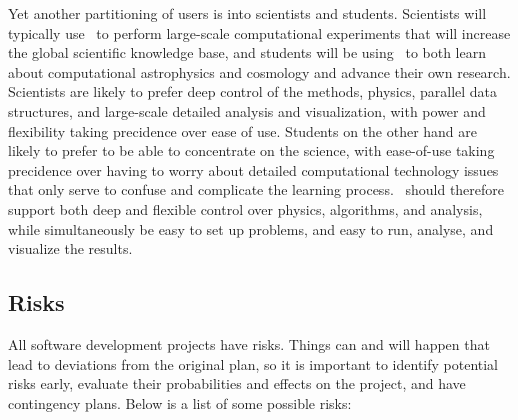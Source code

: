 \documentclass[11pt]{article}
\begin{document}
    Yet another partitioning of users is into scientists and students.
    Scientists will typically use \cello\ to perform large-scale
    computational experiments that will increase the global scientific
    knowledge base, and students will be using \cello\ to both learn
    about computational astrophysics and cosmology and advance their
    own research.  Scientists are likely to prefer deep control of the
    methods, physics, parallel data structures, and large-scale
    detailed analysis and visualization, with power and flexibility
    taking precidence over ease of use.  Students on the other hand
    are likely to prefer to be able to concentrate on the science,
    with ease-of-use taking precidence over having to worry about
    detailed computational technology issues that only serve to
    confuse and complicate the learning process.  \cello\ should
    therefore support both deep and flexible control over physics,
    algorithms, and analysis, while simultaneously be easy to set up
    problems, and easy to run, analyse, and visualize the results.
    

\subsection{Risks}

   All software development projects have risks.  Things can and will
   happen that lead to deviations from the original plan, so it is
   important to identify potential risks early, evaluate their
   probabilities and effects on the project, and have contingency
   plans.  Below is a list of some possible risks:
\end{document}
